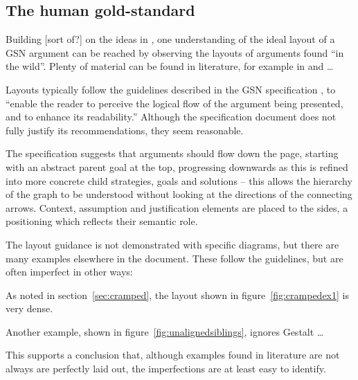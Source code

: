 \subsection{The human gold-standard }

Building [sort of?] on the ideas in \cite{5674033}, one understanding of the ideal layout of a GSN argument can be reached by observing the layouts of arguments found ``in the wild''.
Plenty of material can be found in literature, for example in \cite{Habli:2006:PPC:1183088.1183090} and  \cite{insilico} \ldots

Layouts typically follow the guidelines described in the GSN specification \citep[section~2.2, pp.~26--27]{gsnstandard}, 
to ``enable the reader to perceive the logical flow of the argument being presented, and to enhance its readability.''
Although the specification document does not fully justify its recommendations, they seem reasonable.

The specification suggests that arguments should flow down the page, starting with an abstract parent goal at the top, progressing downwards as this is refined into more concrete child strategies, goals and solutions -- this allows the hierarchy of the graph to be understood without looking at the directions of the connecting arrows.
Context, assumption and justification elements are placed to the sides, a positioning which reflects their semantic role.

The layout guidance is not demonstrated with specific diagrams, but there are many examples elsewhere in the document. These follow the guidelines, but are often imperfect in other ways:

\begin{itemize*}
\item As noted in section~\ref{sec:cramped}, the layout shown in figure~\ref{fig:crampedex1} is very dense.
\item Another example, shown in figure~\ref{fig:unalignedsiblings}, ignores  Gestalt \ldots
\end{itemize*}

This supports a conclusion that, although examples found in literature are not always are perfectly laid out, the imperfections are at least easy to identify.

